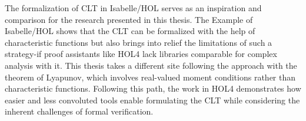 The formalization of CLT in Isabelle/HOL serves as an inspiration and comparison for the research presented in this thesis. The Example of Isabelle/HOL shows that the CLT can be formalized with the help of characteristic functions but also brings into relief the limitations of such a strategy-if proof assistants like HOL4 lack libraries comparable for complex analysis with it. This thesis takes a different site following the approach with the theorem of Lyapunov, which involves real-valued moment conditions rather than characteristic functions. Following this path, the work in HOL4 demonstrates how easier and less convoluted tools enable formulating the CLT while considering the inherent challenges of formal verification.